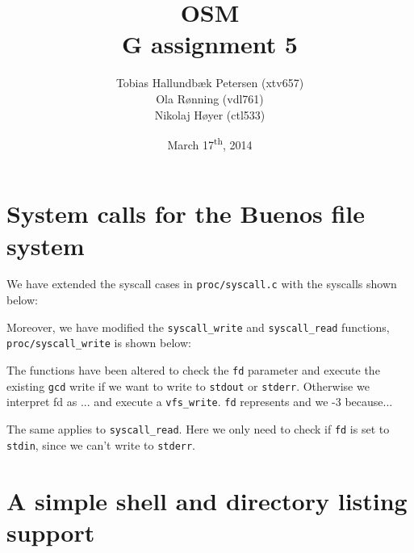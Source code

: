 \documentclass[a4paper,12pt]{article}
\title{OSM\\G assignment 5}
\author{Tobias Hallundbæk Petersen (xtv657)\\Ola Rønning (vdl761)\\Nikolaj Høyer (ctl533)}
\date{March 17\textsuperscript{th}, 2014}
\begin{document}
\maketitle
\tableofcontents
\newpage

\section{System calls for the Buenos file system}
We have extended the syscall cases in \texttt{proc/syscall.c} with the syscalls shown below:


Moreover, we have modified the \texttt{syscall\_write} and \texttt{syscall\_read} functions, \texttt{proc/syscall\_write} is shown below:


The functions have been altered to check the \texttt{fd} parameter and execute the existing \texttt{gcd} write if we want to write to \texttt{stdout} or \texttt{stderr}. Otherwise we interpret fd as ... and execute a \texttt{vfs\_write}. \texttt{fd} represents and we -3 because...

The same applies to \texttt{syscall\_read}. Here we only need to check if \texttt{fd} is set to \texttt{stdin}, since we can't write to \texttt{stderr}.

\section{A simple shell and directory listing support}
\end{document}
